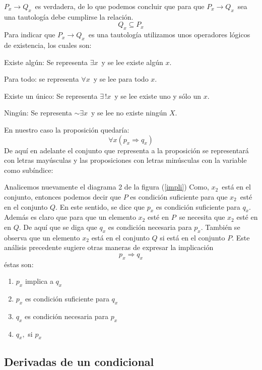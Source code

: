 \begin{figura}
$P_x \rightarrow Q_x$\ es verdadera, de lo que podemos concluir que para que
$P_x \rightarrow Q_x$\ sea una tautología debe cumplirse la relación.
\[ Q_x \subseteq P_x\]
Para indicar que $P_x \rightarrow Q_x$\ es una tautología utilizamos unos
operadores lógicos de existencia, los cuales son:
\begin{lista}
 \item Existe algún: Se representa $\exists x$\ y se lee existe algún $x.$
\item Para todo: se representa $\forall x$\ y se lee para todo $x.$
\item Existe un único: Se representa $\exists\,! x$\ y se lee existe uno y sólo
un $x.$
\item Ningún: Se representa $\sim\exists x$\ y se lee no existe ningún $X.$
\end{lista}
En nuestro caso la proposición quedaría:
\[\forall x (p_x \Longrightarrow q_x) \]
De aquí en adelante el conjunto que representa a la proposición se representará
con letras mayúsculas y las proposiciones con letras minúsculas con la variable
como subíndice:
\end{figura}
Analicemos nuevamente el diagrama 2 de la figura (\ref{impli})
Como, $x_2$\ está en el conjunto, entonces podemos decir que $P$ es
condición suficiente para que $x_2$\ esté en el conjunto $Q$. En este
sentido, se dice que $p_{x}$ es condición suficiente para $q_{x}$. Además es
claro que para que un elemento $x_2$ esté en $P$\ se necesita que $x_2$ esté en
en $Q$. De aquí que se diga que $q_{x}$ es condición necesaria para $p_{x}.$
También se observa que un elemento $x_2$ está en el conjunto $Q$ si está en el
conjunto $P$. Este análisis precedente sugiere otras maneras de expresar la
implicación
\[
p_{x}\Longrightarrow q_{x}%
\]
éstas son:

\begin{enumerate}
\item $p_{x}$ implica a $q_{x}$

\item $p_{x}$ es condición suficiente para $q_{x}$

\item $q_{x}$ es condición necesaria para $p_{x}$

\item $q_{x},$ si $p_{x}$
\end{enumerate}
\subsection{Derivadas de un condicional}

